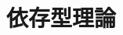 \documentclass[index]{subfiles}
\begin{document}
\chapter{依存型理論}
\label{cha:dependent-type-theory}
\end{document}

